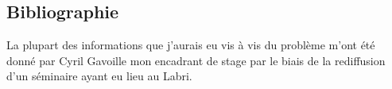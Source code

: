 \subsection{Bibliographie}

La plupart des informations que j'aurais eu vis à vis du problème m'ont été donné par Cyril Gavoille mon encadrant de stage par le biais de la rediffusion d'un séminaire ayant eu lieu au Labri.